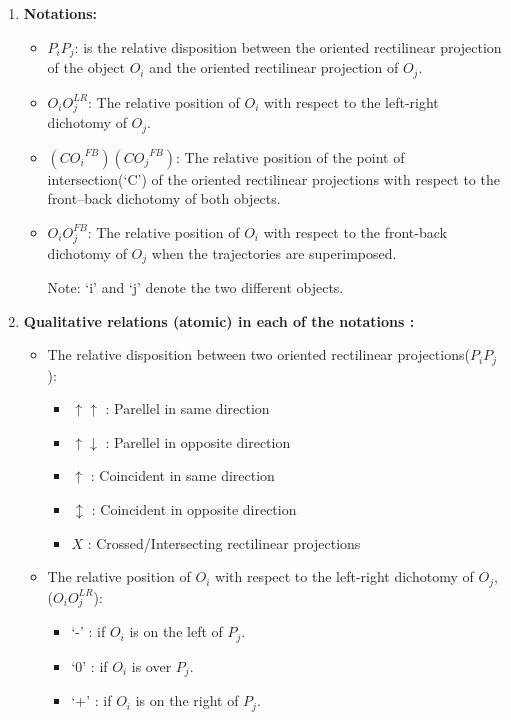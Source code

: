 	\begin{enumerate}
		\item \textbf{Notations:}
		
		\begin{itemize}
			\item $P_iP_j$: is the relative disposition between the oriented rectilinear	projection of the object $O_i$ and the oriented rectilinear projection of $O_j$.
			\item $O_iO_j^{LR}$: The relative position of $O_i$ with respect to the left-right dichotomy of $O_j$.
			\item $({CO_i}^{FB})({CO_j}^{FB})$: The relative position of the point of intersection(`C') of the oriented rectilinear projections with respect to the front–back dichotomy of both objects.
			\item $O_iO_j^{FB}$:  The relative position of $O_i$ with respect to the front-back dichotomy of $O_j$ when the trajectories are superimposed.
			
			Note: `i' and `j' denote the two different objects.
		\end{itemize}
		
		\item \textbf{Qualitative relations (atomic) in each of the notations :}
		\begin{itemize}
			\item The relative disposition between two oriented rectilinear projections($P_iP_j$):
			
			\begin{itemize}
				\item  $\uparrow \uparrow$  : Parellel in same direction
				\item $\uparrow \downarrow$  : Parellel in opposite direction
				\item $\uparrow$  : Coincident in same direction
				\item $\updownarrow$  : Coincident in opposite direction 
				\item $X$  : Crossed/Intersecting rectilinear projections 
			\end{itemize}
		
			\item The relative position of $O_i$ with respect to the left-right
			dichotomy of $O_j$, ($O_iO_j^{LR}$):
			\begin{itemize}
				\item `-' : if $O_i$ is on the left of $P_j$.
				\item `0' : if $O_i$ is over $P_j$.
				\item `+' : if $O_i$ is on the right of $P_j$.
				

\end{itemize}
\end{itemize}
\end{enumerate}
